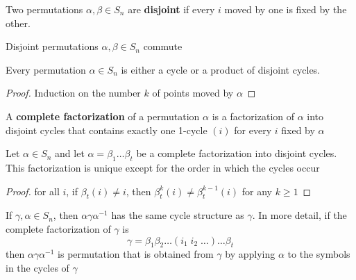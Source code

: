 \documentclass[11pt]{article}
\begin{document}
\begin{definition}[]
Two permutations \(\alpha,\beta\in S_n\) are \textbf{disjoint} if every \(i\)
moved by one is fixed by the other.
\end{definition}

\begin{lemma}[]
Disjoint permutations \(\alpha,\beta\in S_n\) commute
\end{lemma}

\begin{proposition}[]
Every permutation \(\alpha\in S_n\) is either a cycle or a product of disjoint cycles.
\end{proposition}

\begin{proof}
Induction on the number \(k\) of points moved by \(\alpha\)
\end{proof}

\begin{definition}[]
A \textbf{complete factorization} of a permutation \(\alpha\) is a
factorization of \(\alpha\) into disjoint cycles that contains exactly one
1-cycle \((i)\) for every \(i\) fixed by \(\alpha\)
\end{definition}

\begin{theorem}[]
Let \(\alpha\in S_n\) and let \(\alpha=\beta_1\dots\beta_t\) be a complete
factorization into disjoint cycles. This factorization is unique except for
the order in which the cycles occur
\end{theorem}

\begin{proof}
for all \(i\), if \(\beta_t(i)\neq i\), then \(\beta_t^k(i)\neq\beta_t^{k-1}(i)\)
for any \(k\ge 1\)
\end{proof}

\begin{lemma}[]
If \(\gamma,\alpha\in S_n\), then \(\alpha\gamma\alpha^{-1}\) has the same cycle
structure as \(\gamma\). In more detail, if the complete factorization of
\(\gamma\) is
\begin{equation*}
\gamma=\beta_1\beta_2\dots(i_1\; i_2\;\dots)\dots\beta_t
\end{equation*}
then \(\alpha\gamma\alpha^{-1}\) is permutation that is obtained from \(\gamma\)
by applying \(\alpha\) to the symbols in the cycles of \(\gamma\)
\end{lemma}
\end{document}
